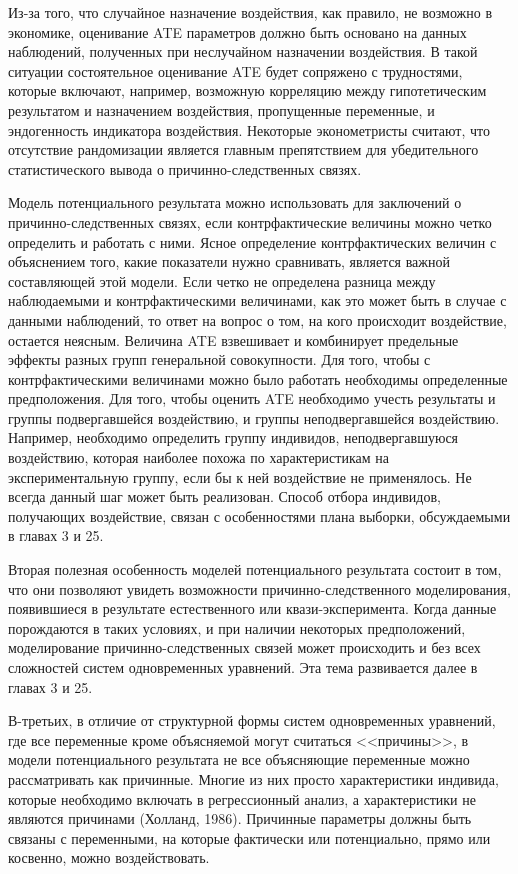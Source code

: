 	
Из-за того, что случайное назначение воздействия, как правило, не  возможно в экономике, оценивание ATE параметров должно быть основано на данных наблюдений, полученных при неслучайном назначении воздействия. 
В такой ситуации состоятельное оценивание ATE будет сопряжено с трудностями, которые включают, например, возможную корреляцию между гипотетическим результатом и назначением воздействия, пропущенные переменные, и эндогенность индикатора воздействия. Некоторые эконометристы считают, что отсутствие рандомизации является главным препятствием для убедительного статистического вывода о причинно-следственных связях.
	
	
Модель потенциального результата можно использовать для заключений о причинно-следственных связях, если контрфактические величины можно четко определить и работать с ними.
Ясное определение контрфактических величин с объяснением того, какие показатели нужно сравнивать, является важной составляющей этой модели. Если четко не определена разница  между наблюдаемыми и контрфактическими величинами,  как это может быть в случае с данными наблюдений, то ответ на вопрос о том, на кого происходит воздействие, остается неясным. 
Величина ATE взвешивает и комбинирует предельные эффекты разных групп генеральной совокупности. Для того, чтобы с контрфактическими величинами можно было работать необходимы определенные предположения. Для того, чтобы оценить ATE необходимо учесть результаты и группы подвергавшейся воздействию, и группы неподвергавшейся воздействию.
Например, необходимо определить группу индивидов, неподвергавшуюся воздействию, которая наиболее похожа по характеристикам на экспериментальную группу, если бы к ней воздействие не применялось. Не всегда данный шаг может быть реализован.
Способ отбора индивидов, получающих воздействие, связан с особенностями плана выборки, обсуждаемыми в главах 3 и 25.

	
	
Вторая полезная особенность моделей потенциального результата состоит в том, что они позволяют увидеть  возможности причинно-следственного моделирования, появившиеся в результате естественного или квази-эксперимента. Когда данные порождаются в таких условиях, и при наличии некоторых предположений,  моделирование причинно-следственных связей  может происходить и без всех сложностей систем одновременных уравнений. Эта тема развивается далее в главах 3 и 25.


	В-третьих, в отличие от структурной формы систем одновременных уравнений, где все переменные кроме объясняемой могут считаться <<причины>>, в модели потенциального результата не все объясняющие переменные можно рассматривать как причинные. Многие из них просто характеристики индивида, которые необходимо включать в регрессионный анализ, а характеристики не являются причинами (Холланд, 1986). Причинные параметры должны быть связаны с переменными, на которые фактически или потенциально, прямо или косвенно, можно воздействовать.
	
